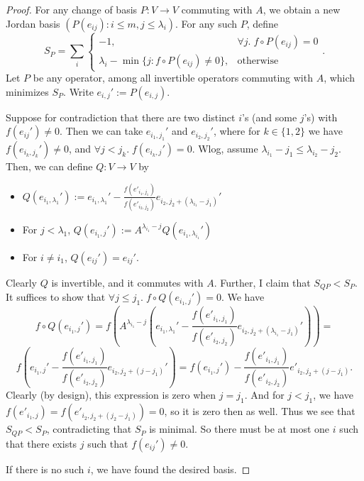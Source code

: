 \documentclass[12pt,psamsfonts]{article}
\begin{document}
\begin{proof}
    For any change of basis \(P : V \to V\) commuting with \(A\), we obtain a new Jordan basis \((P(e_{ij}) : i \leq m, j \leq \lambda_i)\).
    For any such \(P\), define 
    \[S_P = \sum_i \begin{cases}-1, & \forall j. \; f \circ P(e_{ij}) = 0 \\ \lambda_i - \min\{j : f \circ P(e_{ij}) \neq 0\}, & \textrm{otherwise} \end{cases}.\]
    Let \(P\) be any operator, among all invertible operators commuting with \(A\), which minimizes \(S_P\).
    Write \(e_{i,j}' := P(e_{i,j})\).
    \par Suppose for contradiction that there are two distinct \(i\)'s (and some \(j\)'s) with \(f(e_{ij}') \neq 0\).
    Then we can take \(e_{i_1, j_1}'\) and \(e_{i_2, j_2}'\), where for \(k \in \{1,2\}\) we have \(f(e_{i_k, j_k}') \neq 0\), and \(\forall j < j_k. \; f(e_{i_k, j}') = 0\).
    Wlog, assume \(\lambda_{i_1} - j_1 \leq \lambda_{i_2} - j_2\).
    Then, we can define \(Q : V \to V\) by
    \begin{itemize}
        \item \(Q(e_{i_1, \lambda_1}') := e_{i_1, \lambda_1}' - \frac{f(e'_{i_1, j_1})}{f(e'_{i_2, j_2})}e_{i_2, j_2 + (\lambda_{i_1} - j_1)}'\)
        \item For \(j < \lambda_1\), \(Q(e_{i_1, j}') := A^{\lambda_{i_1} - j} Q(e_{i_1, \lambda_{i_1}}')\)
        \item For \(i \neq i_1\), \(Q(e_{ij}') = e_{ij}'\).
    \end{itemize}
    Clearly \(Q\) is invertible, and it commutes with \(A\).
    Further, I claim that \(S_{QP}  < S_P\).
    It suffices to show that \(\forall j \leq j_1. \; f \circ Q(e_{i_1,j}') = 0\).
    We have 
    \[f \circ Q(e_{i_1,j}') = f\left(A^{\lambda_{i_1} - j}\left(e_{i_1, \lambda_1}' - \frac{f(e'_{i_1, j_1})}{f(e'_{i_2, j_2})}e_{i_2, j_2 + (\lambda_{i_1} - j_1)}'\right)\right) =\]
    \[f\left(e_{i_1, j}' - \frac{f(e'_{i_1, j_1})}{f(e'_{i_2, j_2})} e_{i_2, j_2 + (j - j_1)}'\right) = f(e_{i_1, j}') - \frac{f(e'_{i_1, j_1})}{f(e'_{i_2, j_2})} e'_{i_2, j_2 + (j - j_1)}.\]
    Clearly (by design), this expression is zero when \(j = j_1\).
    And for \(j < j_1\), we have \(f(e'_{i_1, j}) = f(e'_{i_2, j_2 + (j_2 - j_1)}) = 0\), so it is zero then as well.
    Thus we see that \(S_{QP} < S_P\), contradicting that \(S_P\) is minimal.
    So there must be at most one \(i\) such that there exists \(j\) such that \(f(e_{ij}') \neq 0\).
    \par If there is no such \(i\), we have found the desired basis.

\end{proof}
\end{document}
